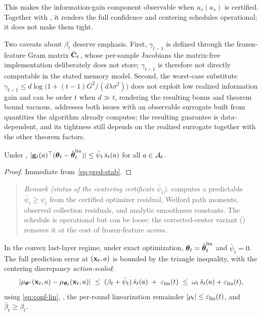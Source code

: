 \documentclass[twoside]{article}
\begin{document}
\noindent
This makes the information-gain component observable when $u_s(a_s)$ is
certified.  Together with , it renders the full
confidence and centering schedules operational; it does not make them tight.

\begin{remark}
Two caveats about $\beta_t$ deserve emphasis.
First, $\gamma_{t-1}$ is defined through the frozen-feature Gram
matrix $\bar{\mathbf{C}}_t$, whose per-sample Jacobians the matrix-free
implementation deliberately does not store; $\gamma_{t-1}$ is
therefore not directly computable in the stated memory model.
Second, the worst-case substitute
$\gamma_{t-1}\le d\log\bigl(1+(t-1)G^2/(d\lambda\sigma^2)\bigr)$
does not exploit low realized information gain and can be order $t$ when
$d\gg t$, rendering the resulting bonus and theorem bound vacuous.
 addresses both issues with an observable surrogate
built from quantities the algorithm already computes; the resulting
guarantee is data-dependent, and its tightness still depends on the realized
surrogate together with the other theorem factors.
\end{remark}

\begin{lemma}\label{lem:discrepancy}
Under ,
$|\mathbf{g}_t(a)^\top(\boldsymbol{\theta}_t - \hat{\boldsymbol{\theta}}_t^{\mathrm{lin}})|\le
\bar\psi_t\,\bar s_t(a)$
for all $a\in\mathcal{A}_t$.
\end{lemma}
\begin{proof}
Immediate from~\eqref{eq:pred-stab}.
\end{proof}

\begin{quote}\small
\emph{Remark (status of the centering certificate $\bar\psi_t$).}
 computes a predictable
$\bar\psi_t\ge\psi_t$ from the certified optimizer residual, Welford path
moments, observed collection residuals, and analytic smoothness constants.
The schedule is operational but can be loose; the corrected-center variant
() removes it at the cost of frozen-feature access.
\end{quote}
In the convex last-layer regime, under exact optimization,
$\boldsymbol{\theta}_t = \hat{\boldsymbol{\theta}}_t^{\mathrm{lin}}$ and $\bar\psi_t=0$.
The full prediction error at $(\mathbf{x}_t,a)$ is bounded by the triangle
inequality, with the centering discrepancy \emph{action-scaled}:
\begin{equation}\label{eq:pred-error}
  |\mu_{\boldsymbol{\theta}^*}(\mathbf{x}_t,a) - \mu_{\boldsymbol{\theta}_t}(\mathbf{x}_t,a)|
  \;\le\;
  (\beta_t+\bar\psi_t)\,\bar s_t(a)
  \;+\;
  \varepsilon_{\mathrm{lin}}(t)
  \;\le\;
  \omega_t\,\bar s_t(a)+\varepsilon_{\mathrm{lin}}(t),
\end{equation}
using \eqref{eq:conf-lin}, , the per-round
linearization remainder $|\rho_t|\le\varepsilon_{\mathrm{lin}}(t)$, and $\bar\beta_t\ge\beta_t$.
\end{document}
